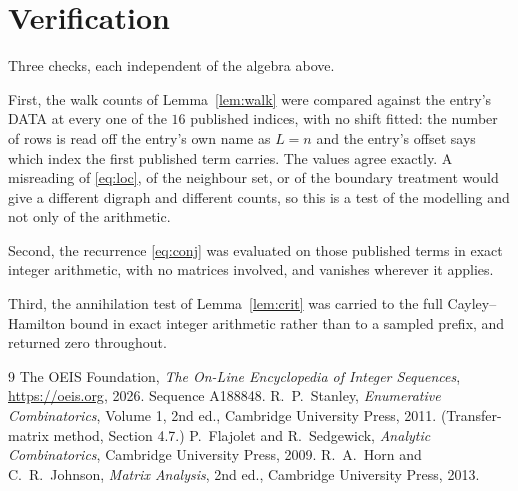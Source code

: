 \documentclass[11pt,a4paper]{article}
\theoremstyle{plain}
\theoremstyle{definition}
\begin{document}
\section{Verification}

Three checks, each independent of the algebra above.

First, the walk counts of Lemma~\ref{lem:walk} were compared against the entry's DATA at
every one of the $16$ published indices, with no shift fitted: the number of rows is
read off the entry's own name as $L=n$ and the entry's offset says which index the first
published term carries. The values agree exactly. A misreading of \eqref{eq:loc}, of the
neighbour set, or of the boundary treatment would give a different digraph and different
counts, so this is a test of the modelling and not only of the arithmetic.

Second, the recurrence \eqref{eq:conj} was evaluated on those published terms in exact
integer arithmetic, with no matrices involved, and vanishes wherever it applies.

Third, the annihilation test of Lemma~\ref{lem:crit} was carried to the full
Cayley--Hamilton bound in exact integer arithmetic rather than to a sampled prefix, and
returned zero throughout.

\begin{thebibliography}{9}
 The OEIS Foundation, \emph{The On-Line Encyclopedia of Integer
Sequences}, \url{https://oeis.org}, 2026. Sequence A188848.
 R.~P.~Stanley, \emph{Enumerative Combinatorics}, Volume 1, 2nd ed.,
Cambridge University Press, 2011. (Transfer-matrix method, Section 4.7.)
 P.~Flajolet and R.~Sedgewick, \emph{Analytic Combinatorics}, Cambridge
University Press, 2009.
 R.~A.~Horn and C.~R.~Johnson, \emph{Matrix Analysis}, 2nd ed., Cambridge
University Press, 2013.
\end{thebibliography}
\end{document}
